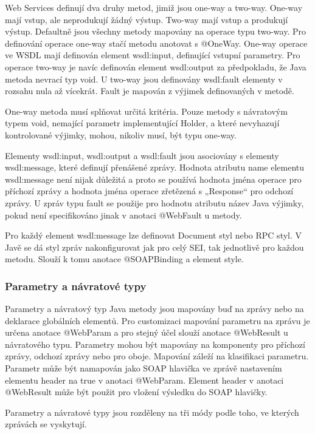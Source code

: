 \documentclass[11pt,twoside,a4paper]{book}
\begin{document}
Web Services definují dva druhy metod, jimiž jsou one-way a two-way. One-way mají vstup,
ale neprodukují žádný výstup. Two-way mají vstup a produkují výstup. Defaultně jsou
všechny metody mapovány na operace typu two-way. Pro definování operace one-way stačí
metodu anotovat s @OneWay. One-way operace ve WSDL mají definován element
wsdl:input, definující vstupní parametry. Pro operace two-way je navíc definován element
wsdl:output za předpokladu, že Java metoda nevrací typ void. U two-way jsou definovány
wsdl:fault elementy v rozsahu nula až vícekrát. Fault je mapován z výjimek definovaných v
metodě.

One-way metoda musí splňovat určitá kritéria. Pouze metody s návratovým typem void,
nemající parametr implementující Holder, a které nevyhazují kontrolované výjimky, mohou,
nikoliv musí, být typu one-way.

Elementy wsdl:input, wsdl:output a wsdl:fault jsou asociovány s elementy wsdl:message,
které definují přenášené zprávy. Hodnota atributu name elementu wsdl:message není nijak
důležitá a proto se používá hodnota jména operace pro příchozí zprávy a hodnota jména
operace zřetězená s „Response“ pro odchozí zprávy. U zpráv typu fault se použije pro
hodnotu atributu název Java výjimky, pokud není specifikováno jinak v anotaci @WebFault u
metody.

Pro každý element wsdl:message lze definovat Document styl nebo RPC styl. V Javě se dá
styl zpráv nakonfigurovat jak pro celý SEI, tak jednotlivě pro každou metodu. Slouží k tomu
anotace @SOAPBinding a element style.

\subsubsection{Parametry a návratové typy}

Parametry a návratový typ Java metody jsou mapovány buď na zprávy nebo na deklarace
globálních elementů. Pro customizaci mapování parametru na zprávu je určena anotace
@WebParam a pro stejný účel slouží anotace @WebResult u návratového typu. Parametry
mohou být mapovány na komponenty pro příchozí zprávy, odchozí zprávy nebo pro oboje.
Mapování záleží na klasifikaci parametru. Parametr může být namapován jako SOAP
hlavička ve zprávě nastavením elementu header na true v anotaci @WebParam. Element
header v anotaci @WebResult může být použit pro vložení výsledku do SOAP hlavičky.

Parametry a návratové typy jsou rozděleny na tři módy podle toho, ve kterých zprávách se
vyskytují.
\end{document}
